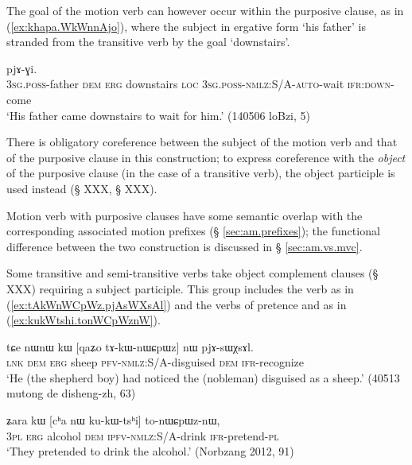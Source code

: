 The goal of the motion verb can however occur within the purposive clause, as in (\ref{ex:khapa.WkWnnAjo}), where the subject in ergative form  `his father' is stranded from the transitive verb  by the goal  `downstairs'.

\begin{exe}
\ex \label{ex:khapa.WkWnnAjo}
  pjɤ-ɣi.  \\
  \textsc{3sg}.\textsc{poss}-father \textsc{dem} \textsc{erg} downstairs \textsc{loc}    \textsc{3sg}.\textsc{poss}-\textsc{nmlz}:S/A-\textsc{auto}-wait \textsc{ifr}:\textsc{down}-come \\
  \glt `His father came downstairs to wait for him.' (140506 loBzi, 5)
\end{exe}

There is obligatory coreference between the subject of the motion verb and that of the purposive clause in this construction; to express coreference with the \textit{object} of the purposive clause (in the case of a transitive verb), the object participle is used instead (§ XXX, § XXX). 

Motion verb with purposive clauses have some semantic overlap with the corresponding associated motion prefixes (§ \ref{sec:am.prefixes}); the functional difference between the two construction is discussed in § \ref{sec:am.vs.mvc}.

Some transitive and semi-transitive verbs take object complement clauses (§ XXX) requiring a subject participle. This group includes the verb  as in (\ref{ex:tAkWnWCpWz.pjAsWXsAl}) and the verbs of pretence  and  as in (\ref{ex:kukWtshi.tonWCpWznW}). 

\begin{exe}
\ex \label{ex:tAkWnWCpWz.pjAsWXsAl}
 \gll tɕe nɯnɯ kɯ [qaʑo tɤ-kɯ-nɯɕpɯz] nɯ pjɤ-sɯχsɤl. \\
 \textsc{lnk} \textsc{dem} \textsc{erg} sheep \textsc{pfv}-\textsc{nmlz}:S/A-disguised \textsc{dem} \textsc{ifr}-recognize \\
\glt `He (the shepherd boy) had noticed the (nobleman) disguised as a sheep.' (40513 mutong de disheng-zh, 63)
\end{exe}

\begin{exe}
\ex \label{ex:kukWtshi.tonWCpWznW}
 \gll  ʑara kɯ [cʰa nɯ ku-kɯ-tsʰi] to-nɯɕpɯz-nɯ, \\
\textsc{3pl} \textsc{erg} alcohol \textsc{dem} \textsc{ipfv}-\textsc{nmlz}:S/A-drink \textsc{ifr}-pretend-\textsc{pl} \\
\glt  `They pretended to drink the alcohol.'  (Norbzang 2012, 91)
\end{exe}

